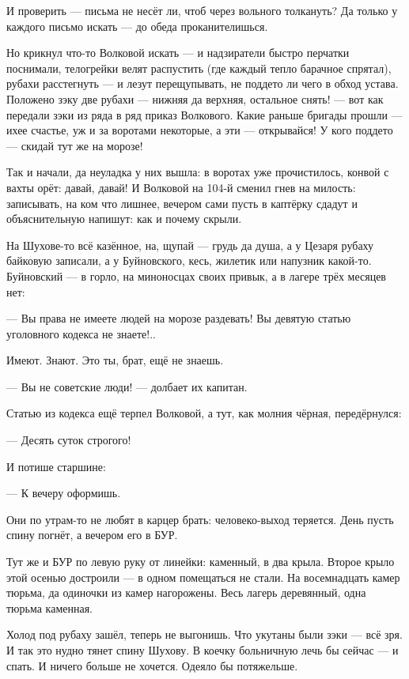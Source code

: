 И проверить --- письма не несёт ли, чтоб через вольного толкануть? Да только у каждого письмо 
искать --- до обеда проканителишься.

Но крикнул что-то Волковой искать --- и надзиратели быстро перчатки поснимали, телогрейки 
велят распустить (где каждый тепло барачное спрятал), рубахи расстегнуть --- и лезут 
перещупывать, не поддето ли чего в обход устава. Положено зэку две рубахи --- нижняя да 
верхняя, остальное снять! --- вот как передали зэки из ряда в ряд приказ Волкового. Какие 
раньше бригады прошли --- ихее счастье, уж и за воротами некоторые, а эти --- открывайся! У кого 
поддето --- скидай тут же на морозе!

Так и начали, да неуладка у них вышла: в воротах уже прочистилось, конвой с вахты орёт: давай, 
давай! И Волковой на 104-й сменил гнев на милость: записывать, на ком что лишнее, вечером сами 
пусть в каптёрку сдадут и объяснительную напишут: как и почему скрыли.

На Шухове-то всё казённое, на, щупай --- грудь да душа, а у Цезаря рубаху байковую записали, а у 
Буйновского, кесь, жилетик или напузник какой-то. Буйновский --- в горло, на миноносцах своих 
привык, а в лагере трёх месяцев нет:

--- Вы права не имеете людей на морозе раздевать! Вы девятую статью уголовного кодекса не 
знаете!..

Имеют. Знают. Это ты, брат, ещё не знаешь.

--- Вы не советские люди! --- долбает их капитан.

Статью из кодекса ещё терпел Волковой, а тут, как молния чёрная, передёрнулся:

--- Десять суток строгого!

И потише старшине:

--- К вечеру оформишь.

Они по утрам-то не любят в карцер брать: человеко-выход теряется. День пусть спину погнёт, а 
вечером его в БУР.

Тут же и БУР по левую руку от линейки: каменный, в два крыла. Второе крыло этой осенью 
достроили --- в одном помещаться не стали. На восемнадцать камер тюрьма, да одиночки из камер 
нагорожены. Весь лагерь деревянный, одна тюрьма каменная.

Холод под рубаху зашёл, теперь не выгонишь. Что укутаны были зэки --- всё зря. И так это нудно 
тянет спину Шухову. В коечку больничную лечь бы сейчас --- и спать. И ничего больше не хочется. 
Одеяло бы потяжельше.

